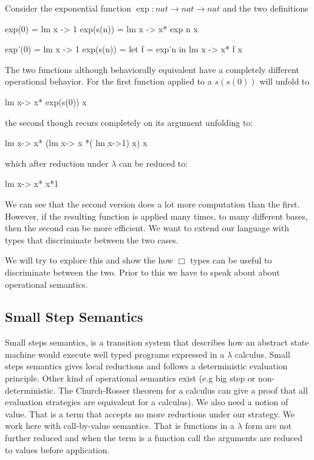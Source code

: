 Consider the exponential function $\operatorname{exp}:nat\rightarrow nat\rightarrow nat$  and the two definitions
\begin{code}
exp(0) = lm x -> 1
exp(s(n)) = lm x -> x* exp n x
\end{code}
\begin{code}
exp'(0) = lm x -> 1
exp(s(n)) = let f = exp'n in lm x -> x* f x 
 \end{code}
The two functions although behaviorally equivalent have a completely different operational behavior.
For the first function applied to a $s(s(0))$ will unfold to 
\begin{code}
lm x-> x* exp(s(0)) x 
\end{code} 
the second though recurs completely on its argument unfolding  to:
\begin{code}
lm x-> x* (lm x-> x *( lm x->1) x) x
\end{code}
which after reduction under $\lambda$ can be reduced to:
\begin{code}
lm x-> x* x*1
\end{code}
We can see that the second version does a lot more computation than
the first. However, if the resulting function is applied many times, to many
different bases, then the second can be more efficient. We want to extend our language with types 
that discriminate between the two cases. 

We will try to explore this and show the how $\Box$ types can be useful to discriminate between the two.
Prior to this we have to speak about about operational semantics.
\subsection{Small Step Semantics}
Small steps semantics, is a transition system that describes how an abstract state machine would execute well typed programs expressed in a $\lambda$ calculus. Small steps semantics gives local reductions and follows a deterministic evaluation principle. Other kind of operational semantics exist (e.g big step or non-deterministic. The Church-Rosser theorem for a calculus can give a proof that all evaluation strategies are equivalent for a calculus). We also need a notion of value. That is a term that accepts no more reductions under our strategy. We work here with call-by-value semantics. That is functions in a $\lambda$ form are not further reduced and when the term is a function call the arguments are reduced to values before application.


